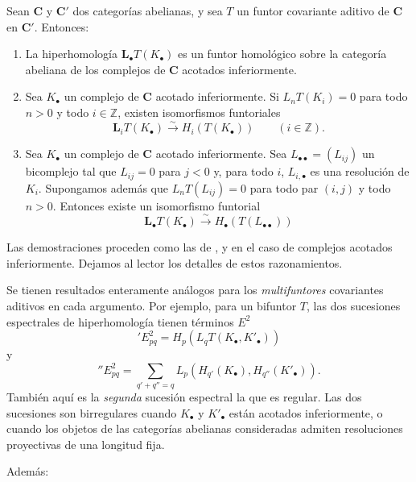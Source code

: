 \begin{proposition}[11.6.3]
\label{0.11.6.3}
\label{0.11.6.3-fr}
Sean $\boldsymbol{C}$ y $\boldsymbol{C}'$ dos categorías abelianas, y sea $T$ un funtor covariante aditivo de $\boldsymbol{C}$ en $\boldsymbol{C}'$.
Entonces:
\begin{enumerate}
  \item[{\rm(i)}] {La hiperhomología $\mathbf{L}_\bullet T(K_\bullet)$ es un funtor homológico sobre la categoría abeliana de los complejos de $\boldsymbol{C}$ acotados inferiormente.}

  \item[{\rm(ii)}] {Sea $K_\bullet$ un complejo de $\boldsymbol{C}$ acotado inferiormente.
  Si $L_nT(K_i)=0$ para todo $n>0$ y todo $i\in\mathbb Z$, existen isomorfismos funtoriales}
  \[
\label{0.11.6.3.1-fr}
\tag{11.6.3.1}
\mathbf{L}_iT(K_\bullet)\xrightarrow{\sim} H_i(T(K_\bullet))\qquad(i\in\mathbb Z).
\]

  \item[{\rm(iii)}] {Sea $K_\bullet$ un complejo de $\boldsymbol{C}$ acotado inferiormente.
  Sea $L_{\bullet\bullet}=(L_{ij})$ un bicomplejo tal que $L_{ij}=0$ para $j<0$ y, para todo $i$, $L_{i,\bullet}$ es una resolución de $K_i$.
  Supongamos además que $L_nT(L_{ij})=0$ para todo par $(i,j)$ y todo $n>0$.
  Entonces existe un isomorfismo funtorial}
  \[
\label{0.11.6.3.2-fr}
\tag{11.6.3.2}
\mathbf{L}_\bullet T(K_\bullet)\xrightarrow{\sim} H_\bullet(T(L_{\bullet\bullet}))
\]
\end{enumerate}

\upshape Las demostraciones proceden como las de ,  y  en el caso de complejos acotados inferiormente.
Dejamos al lector los detalles de estos razonamientos.
\end{proposition}

\begin{env}[11.6.4]
\label{0.11.6.4}
\label{0.11.6.4-fr}
Se tienen resultados enteramente análogos para los \emph{multifuntores} covariantes aditivos en cada argumento.
Por ejemplo, para un bifuntor $T$, las dos sucesiones espectrales de hiperhomología tienen términos $E^2$
\[
\label{0.11.6.4.1-fr}
\tag{11.6.4.1}
{}'E^2_{pq}=H_p(L_qT(K_\bullet,K'_\bullet))
\]
y
\[
\label{0.11.6.4.2-fr}
\tag{11.6.4.2}
{}''E^2_{pq}=
\sum_{q'+q''=q}L_p(H_{q'}(K_\bullet),H_{q''}(K'_\bullet)).
\]
También aquí es la \emph{segunda} sucesión espectral la que es regular.
Las dos sucesiones son birregulares cuando $K_\bullet$ y $K'_\bullet$ están acotados inferiormente, o cuando los objetos de las categorías abelianas consideradas admiten resoluciones proyectivas de una longitud fija.

Además:
\end{env}

